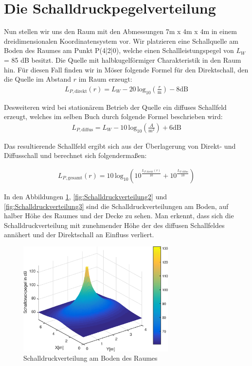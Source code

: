\section{Die Schalldruckpegelverteilung}
\label{sec:sdpv}

Nun stellen wir uns den Raum mit den Abmessungen 7m x 4m x 4m in einem dreidimensionalen Koordinatensystem vor. Wir platzieren eine Schallquelle am Boden des Raumes am Punkt P(4|2|0), welche einen Schallleistungspegel von $L_W$ = 85 dB besitzt. Die Quelle mit halbkugelförmiger Charakteristik in den Raum hin. Für diesen Fall finden wir in Möser \cite{Moeser15} folgende Formel für den Direktschall, den die Quelle im Abstand $r$ im Raum erzeugt: 
\begin{align*}
L_{P, \mathrm{direkt}}(r) = L_W - 20\,\mathrm{log}_{10} \left( \frac{r}{\mathrm{m}}\right) - 8 \mathrm{dB}
\end{align*} 

Desweiteren wird bei stationärem Betrieb der Quelle ein diffuses Schallfeld erzeugt, welches im selben Buch durch folgende Formel beschrieben wird: 
\begin{align*}
L_{P, \mathrm{diffus}} = L_W - 10\,\mathrm{log}_{10} \left( \frac{A}{\mathrm{m}^2}\right) +6 \mathrm{dB}
\end{align*} 

Das resultierende Schallfeld ergibt sich aus der Überlagerung von Direkt- und Diffusschall und berechnet sich folgendermaßen:

\begin{align*}
L_{P, \mathrm{gesamt}}(r) = 10\,\mathrm{log}_{10}\left(10^{\frac{L_{P,\mathrm{direkt}}(r)}{10}}+ 10^{\frac{L_{P,\mathrm{diffus}}}{10}}\right)
\end{align*} 

In den Abbildungen \ref{fig:Schalldruckverteilung}, \ref{fig:Schalldruckverteilung2} und \ref{fig:Schalldruckverteilung3} sind die Schalldruckverteilungen am Boden, auf halber Höhe des Raumes und der Decke zu sehen.
Man erkennt, dass sich die Schalldruckverteilung mit zunehmender Höhe der des diffusen Schallfeldes annähert und der Direktschall an Einfluss verliert.

\begin{figure}[H]
    \center
    \includegraphics[width = 0.7\textwidth]{figures/Schalldruckverteilung}
    \caption{Schalldruckverteilung am Boden des Raumes}
    \label{fig:Schalldruckverteilung}
\end{figure}

